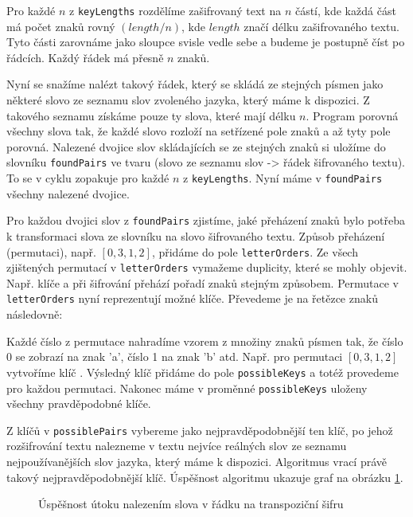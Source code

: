 \documentclass[glossaries, index]{kidiplom}
\begin{document}
Pro každé $n$ z \texttt{keyLengths} rozdělíme zašifrovaný text na $n$ částí, kde každá část má počet znaků rovný $(length / n)$, kde $length$ značí délku zašifrovaného textu. Tyto části zarovnáme jako sloupce svisle vedle sebe a budeme je postupně číst po řádcích. Každý řádek má přesně $n$ znaků.

Nyní se snažíme nalézt takový řádek, který se skládá ze stejných písmen jako některé slovo ze seznamu slov zvoleného jazyka, který máme k dispozici. Z takového seznamu získáme pouze ty slova, které mají délku $n$. Program porovná všechny slova tak, že každé slovo rozloží na setřízené pole znaků a až tyty pole porovná. Nalezené dvojice slov skládajících se ze stejných znaků si uložíme do slovníku \texttt{foundPairs} ve tvaru (slovo ze seznamu slov -> řádek šifrovaného textu). To se v cyklu zopakuje pro každé $n$ z \texttt{keyLengths}. Nyní máme v \texttt{foundPairs} všechny nalezené dvojice.

Pro každou dvojici slov z \texttt{foundPairs} zjistíme, jaké přeházení znaků bylo potřeba k transformaci slova ze slovníku na slovo šifrovaného textu. Způsob přeházení (permutaci), např. $[0, 3, 1, 2]$, přidáme do pole \texttt{letterOrders}. Ze všech zjištených permutací v \texttt{letterOrders} vymažeme duplicity, které se mohly objevit. Např. klíče  a  při šifrování přehází pořadí znaků stejným způsobem. Permutace v \texttt{letterOrders} nyní reprezentují možné klíče. Převedeme je na řetězce znaků následovně:

Každé číslo z permutace nahradíme vzorem z množiny znaků písmen tak, že číslo 0 se zobrazí na znak 'a', číslo 1 na znak 'b' atd. Např. pro permutaci $[0, 3, 1, 2]$ vytvoříme klíč . Výsledný klíč přidáme do pole \texttt{possibleKeys} a totéž provedeme pro každou permutaci. Nakonec máme v proměnné \texttt{possibleKeys} uloženy všechny pravděpodobné klíče.

Z klíčů v \texttt{possiblePairs} vybereme jako nejpravděpodobnější ten klíč, po jehož rozšifrování textu nalezneme v textu nejvíce reálných slov ze seznamu nejpoužívanějších slov jazyka, který máme k dispozici. Algoritmus vrací právě takový nejpravděpodobnější klíč. Úspěšnost algoritmu ukazuje graf na obrázku \ref{graf-transpozice-hledanislova}.

\begin{figure}[htbp]
\centering
{}
\caption{Úspěšnost útoku nalezením slova v řádku na transpoziční šifru}
\label{graf-transpozice-hledanislova}
\end{figure}
\end{document}
